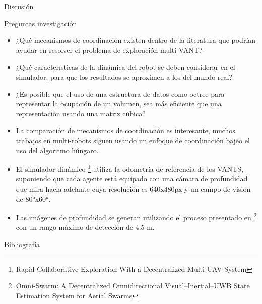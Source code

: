 \documentclass[
  24pt, %
  aspectratio=169, %
]{beamer}
\begin{document}
\begin{frame}{Discusión}
  \scriptsize
  \begin{block}{Preguntas investigación}
    \begin{itemize}
    \item ¿Qué mecanismos de coordinación existen dentro de la literatura que podrían ayudar en resolver el problema de exploración multi-VANT?\\
    \item ¿Qué características de la dinámica del robot se deben considerar en el simulador, para que los resultados se aproximen a los del mundo real?\\
    \item ¿Es posible que el uso de una estructura de datos como octree para representar la ocupación de un volumen, sea más eﬁciente que una representación usando una matriz cúbica?\\
    \end{itemize}
  \end{block}
  \begin{itemize}
  \item La comparación de mecanismos de coordinación es interesante, muchos trabajos en multi-robots siguen usando un enfoque de coordinación bajeo el uso del algoritmo húngaro.
  \item El simulador dinámico \cite{RACER2022} \footnote{\tiny Rapid Collaborative Exploration With a Decentralized Multi-UAV System} utiliza la odometría de referencia de los VANTS, suponiendo que cada agente está equipado con una cámara de profundidad que mira hacia adelante cuya resolución es 640x480px y un campo de visión de 80°x60°.
  \item Las imágenes de profundidad se generan utilizando el proceso presentado en \cite{OMNI2022} \footnote{\tiny Omni-Swarm: A Decentralized Omnidirectional Visual–Inertial–UWB State Estimation System for Aerial Swarms} con un rango máximo de detección de 4.5 m.
  \end{itemize}
\end{frame}

\begin{frame}{Bibliografía}
  \tiny
  
  
\end{frame}
\end{document}
